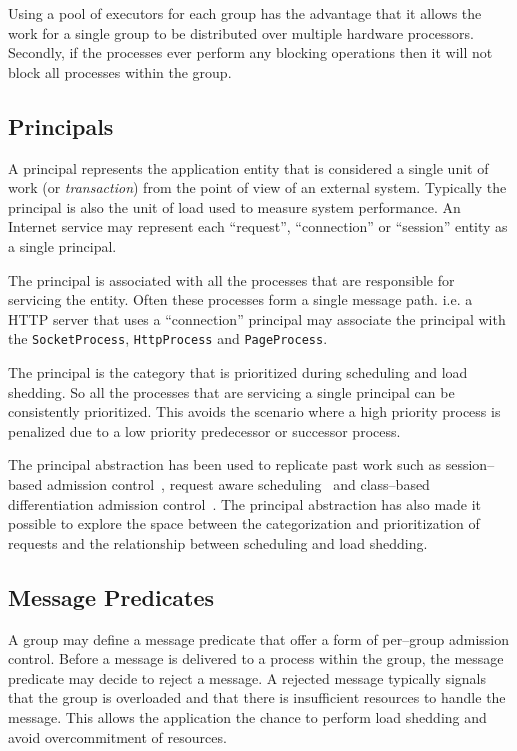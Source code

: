 \documentclass[conference]{IEEEtran}
\begin{document}
Using a pool of executors for each group has the advantage that it allows the work for a single group to be distributed over multiple hardware processors. Secondly, if the processes ever perform any blocking operations then it will not block all processes within the group. 

\subsection{Principals}

A principal represents the application entity that is considered a single unit of work (or \emph{transaction}) from the point of view of an external system. Typically the principal is also the unit of load used to measure system performance. An Internet service may represent each ``request'', ``connection'' or ``session'' entity as a single principal.

The principal is associated with all the processes that are responsible for servicing the entity. Often these processes form a single message path. i.e. a HTTP server that uses a ``connection'' principal may associate the principal with the \verb+SocketProcess+, \verb+HttpProcess+ and \verb+PageProcess+.

The principal is the category that is prioritized during scheduling and load shedding. So all the processes that are servicing a single principal can be consistently prioritized. This avoids the scenario where a high priority process is penalized due to a low priority predecessor or successor process.

The principal abstraction has been used to replicate past work such as session--based admission control~\cite{Cherkasova:2002yb}, request aware scheduling~\cite{Zhou06RequestAware} and class--based differentiation admission control~\cite{welsh03Adaptive}. The principal abstraction has also made it possible to explore the space between the categorization and prioritization of requests and the relationship between scheduling and load shedding.

\subsection{Message Predicates}

A group may define a message predicate that offer a form of per--group admission control. Before a message is delivered to a process within the group, the message predicate may decide to reject a message. A rejected message typically signals that the group is overloaded and that there is insufficient resources to handle the message. This allows the application the chance to perform load shedding and avoid overcommitment of resources.
\end{document}
